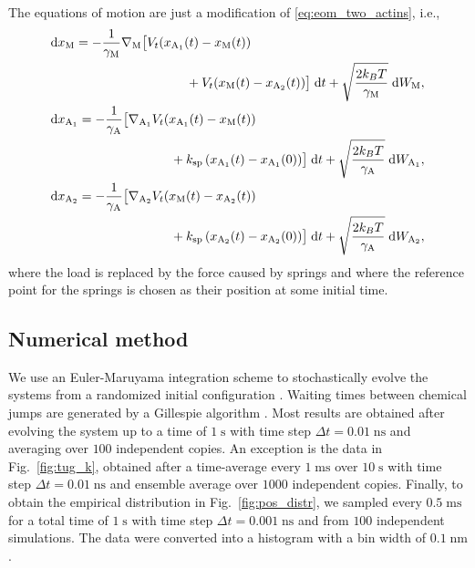 \documentclass[aps,pre,twocolumn,showpacs,showkeys,superscriptaddress,floatfix]{revtex4-1}
\newcommand{\rmd}{{\mathrm d}}
\begin{document}
The equations of motion are just a modification of \eqref{eq:eom_two_actins}, i.e.,   
\begin{equation}
\begin{gathered}
\begin{multlined}[b][.85\linewidth]
\rmd x_\text{M} = 
- \frac{1}{\gamma_\text{M}} \nabla_\text{M} \bigl[ 
V_t(x_{\text{A}_1}(t) - x_\text{M}(t)) 
\\
+ V_t(x_\text{M}(t) - x_{\text{A}_2}(t)) 
\bigr] \; \rmd t 
+ \sqrt{ \frac{2 k_B T}{\gamma_\text{M}} } \; \rmd W_\text{M} ,
\end{multlined}\\
\begin{multlined}[b][.85\linewidth]
\rmd x_{\text{A}_1} = 
- \frac{1}{\gamma_\text{A}} \bigl[ \nabla_{\text{A}_1} V_t( x_{\text{A}_1}(t) - x_\text{M}(t) ) 
\\
+ k_\text{sp} \left( x_{\text{A}_1}(t) - x_{\text{A}_1}(0) \right) \bigr] \; \rmd t 
+ \sqrt{ \frac{2 k_B T}{\gamma_\text{A}} } \; \rmd W_{\text{A}_1} ,
\end{multlined}\\
\begin{multlined}[b][.85\linewidth]
\rmd x_{\text{A}_2} = 
- \frac{1}{\gamma_\text{A}} \bigl[ \nabla_{\text{A}_2} V_t( x_\text{M}(t) - x_{\text{A}_2}(t) )
\\
+ k_\text{sp} \left( x_{\text{A}_2}(t) - x_{\text{A}_2}(0) \right) \bigr] \; \rmd t 
+ \sqrt{ \frac{2 k_B T}{\gamma_\text{A}} } \; \rmd W_{\text{A}_2} ,
\end{multlined}
\end{gathered}
\label{eq:eom_two_actins_no_load}
\end{equation}
where the load is replaced by the force caused by springs and where the reference point for the springs is chosen as their position at some initial time. 

\subsection{Numerical method}
We use an Euler-Maruyama integration scheme to stochastically evolve the systems from a randomized initial configuration \cite{kloeden1989survey,maruyama1955continuous}. 
Waiting times between chemical jumps are generated by a Gillespie algorithm \cite{rao2003stochastic}.
Most results are obtained after evolving the system up to a time of $1\;\mathrm{s}$ with time step $\Delta t = 0.01\;\mathrm{ns}$ and averaging over $100$ independent copies.    
An exception is the data in Fig.~\ref{fig:tug_k}, 
obtained after a time-average every $1\;\mathrm{ms}$ over $10\;\mathrm{s}$ with time step $\Delta t = 0.01\;\mathrm{ns}$ and ensemble average over $1000$ independent copies. Finally, to obtain the empirical distribution in Fig.~\ref{fig:pos_distr}, 
we sampled every $0.5\;\mathrm{ms}$ for a total time of $1\;\mathrm{s}$ with time step $\Delta t = 0.001\;\mathrm{ns}$ and from $100$ independent simulations.  The data were converted into a histogram with a bin width of $0.1\;\mathrm{nm}$.
\end{document}

